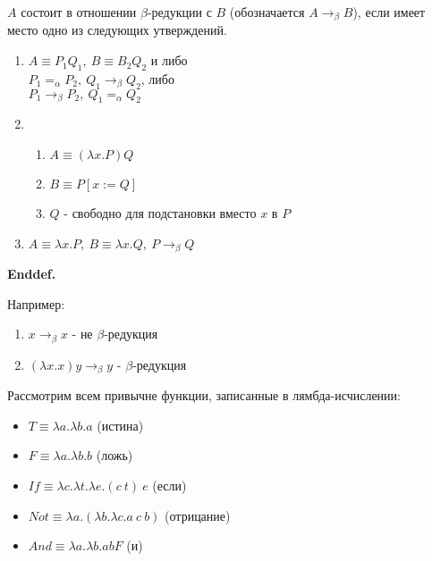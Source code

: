 \documentclass[12pt]{extreport}
\begin{document}
$A$ состоит в отношении $\beta$-редукции с $B$ (обозначается $A \rightarrow_\beta B$), если имеет место одно из следующих утверждений.
\begin{enumerate}[leftmargin=2cm]
    \item $A \equiv P_1Q_1,\ B \equiv B_2Q_2$ и либо \\
    $P_1 =_\alpha P_2,\ Q_1 \rightarrow_\beta Q_2$, либо \\ 
    $P_1 \rightarrow_\beta P_2,\ Q_1 =_\alpha Q_2$ 
    \item \begin{enumerate}
        \item $A \equiv (\lambda x.P)Q$
        \item $B \equiv P[x := Q]$
        \item $Q$ - свободно для подстановки вместо $x$ в $P$
    \end{enumerate}
    \item $A \equiv \lambda x.P,\ B \equiv \lambda x.Q,\ P \rightarrow_\beta Q$
\end{enumerate}
\noindent\textbf{Enddef.}

\vspace{5mm} %

Например: 
    \begin{enumerate}[leftmargin=2cm]
        \item $x \rightarrow_\beta x$ - не $\beta$-редукция 
        \item $(\lambda x.x)y \rightarrow_\beta y$ - $\beta$-редукция 
    \end{enumerate} 
    
Рассмотрим всем привычне функции, записанные в лямбда-исчислении:
\begin{itemize}[leftmargin=2cm]
    \item $T \equiv \lambda a.\lambda b.a$ (истина) 
    \item $F \equiv \lambda a.\lambda b.b$ (ложь) 
    \item $If \equiv \lambda c.\lambda t. \lambda e.(c\ t)\ e$ (если) 
    \item $Not \equiv \lambda a.(\lambda b.\lambda c.a\ c\ b)$ (отрицание)
    \item $And \equiv \lambda a.\lambda b.a b F$ (и)
\end{itemize}
\end{document}
